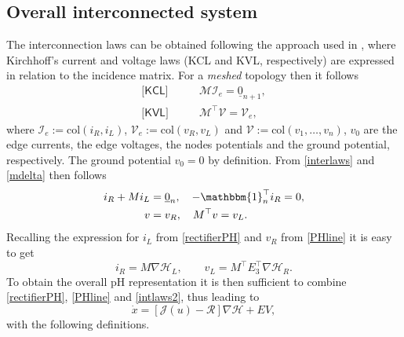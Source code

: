 \documentclass[5p,twocolumn]{elsarticle}
\def\col{\mbox{col}}
\def\lab{\label}
\numberwithin{equation}{section}
\begin{document}
\subsection{Overall interconnected system}
\lab{subsec2.4}
The interconnection laws can be obtained following the approach used in \cite{avdspartial}, where Kirchhoff's current and voltage laws (KCL and KVL, respectively) are expressed in relation to the incidence matrix. For a \textit{meshed} topology then it follows
\begin{equation}\label{interlaws}
\begin{aligned}
\textsf{[KCL]}\qquad&\mathcal M\mathcal{I}_e=\underline{0}_{n+1},\\
\textsf{[KVL]}\qquad&\mathcal M^\top\mathcal{V}=\mathcal{V}_e,
\end{aligned}
\end{equation}
where $\mathcal{I}_e:=\col (i_R,i_L)$, $\mathcal{V}_e:=\col (v_R,v_L)$ and $\mathcal{V}:=\col (v_1,\dots,v_{n})$, $v_0$ are the edge currents, the edge voltages, the nodes potentials and
the {ground} potential, respectively. The {ground} potential $v_0=0$ by definition. From \eqref{interlaws} and \eqref{mdelta} then follows
\begin{equation}
\lab{iril}
\begin{aligned}
i_R+M i_L&=\underline{0}_n,\quad -\mathbbm{1}_n^\top i_R=0,\\
v&=v_{R},\quad  M ^\top v=v_L.
\end{aligned}
\end{equation}
Recalling the expression for $i_L$ from \eqref{rectifierPH} and $v_R$ from \eqref{PHline} it is easy to get
\begin{equation}\label{intlaws2}
i_R=M \nabla\mathcal{H}_L,\qquad v_L=M ^\top E_3^\top\nabla\mathcal{H}_R.
\end{equation}
To obtain the overall pH representation it is then sufficient to combine \eqref{rectifierPH}, \eqref{PHline} and \eqref{intlaws2}, thus leading to
\begin{equation}\label{overall}
\dot{x}=[\mathcal{J}(u)-\mathcal{R}]\nabla\mathcal{H}+EV,
\end{equation}
with  the following definitions.
\end{document}
